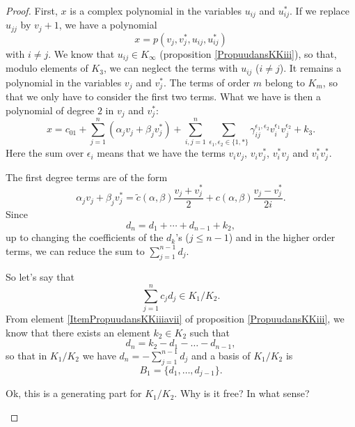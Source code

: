 \begin{proof}
    First, $x$ is a complex polynomial in the variables $u_{ij}$ and $u_{ij}^*$. If we replace $u_{jj}$ by $v_j+1$, we have a polynomial
    \begin{equation}
        x=p(v_j,v_j^*,u_{ij},u_{ij}^*)
    \end{equation}
    with $i\neq j$. We know that $u_{ij}\in K_{\infty}$ (proposition \ref{PropuudansKKiii}), so that, modulo elements of $K_3$, we can neglect the terms with $u_{ij}$ ($i\neq j$). It remains a polynomial in the variables $v_j$ and $v_j^*$. The terms of order $m$ belong to $K_m$, so that we only have to consider the first two terms. What we have is then a polynomial of degree $2$ in $v_j$ and $v_j^*$:
    \begin{equation}        \label{EqxSumvvdgammaUn}
        x=c_01+\sum_{j=1}^n(\alpha_jv_j+\beta_jv_j^*)+\sum_{i,j=1}^n\sum_{\epsilon_1,\epsilon_2\in\{ 1,* \}}\gamma_{ij}^{\epsilon_1,\epsilon_2}v_i^{\epsilon_1}v_j^{\epsilon_2}+k_3.
    \end{equation}
    Here the sum over $\epsilon_i$ means that we have the terms $v_iv_j$, $v_iv_j^*$, $v_i^*v_j$ and $v_i^*v_j^*$.

    The first degree terms are of the form
    \begin{equation}
        \alpha_j v_j+\beta_jv^*_j=\tilde c(\alpha,\beta)\frac{ v_j+v_j^* }{ 2 }+c(\alpha,\beta)\frac{ v_j-v_j^* }{ 2i }.
    \end{equation}
    Since
    \begin{equation}
        d_n=d_1+\cdots+d_{n-1}+k_2,
    \end{equation}
    up to changing the coefficients of the $d_k$'s ($j\leq n-1$) and in the higher order terms, we can reduce the sum to $\sum_{j=1}^{n-1}d_j$.


    So let's say that
    \begin{equation}
        \sum_{j=1}^n c_jd_j\in K_1/K_2.
    \end{equation}
    From element \ref{ItemPropuudansKKiiiavii} of proposition \ref{PropuudansKKiii}, we know that there exists an element $k_2\in K_2$ such that
    \begin{equation}
        d_n=k_2-d_1-\ldots -d_{n-1},
    \end{equation}
    so that in $K_1/K_2$ we have $d_n=-\sum_{j=1}^{n-1}d_j$ and a basis of $K_1/K_2$ is
    \begin{equation}
        B_1=\{ d_1,\ldots,d_{j-1} \}.
    \end{equation}
    \begin{probleme}
        Ok, this is a generating part for $K_1/K_2$. Why is it free? In what sense?
    \end{probleme}
    

\end{proof}
